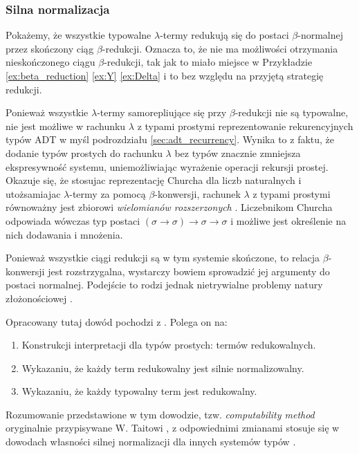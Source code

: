 \subsubsection{Silna normalizacja}
Pokażemy, że wszystkie typowalne \(\lambda\)-termy redukują się do postaci \(\beta\)-normalnej przez skończony ciąg \(\beta\)-redukcji. Oznacza to, że nie ma możliwości otrzymania nieskończonego ciągu \(\beta\)-redukcji, tak jak to miało miejsce w Przykładzie \ref{ex:beta_reduction} \ref{ex:Y} \ref{ex:Delta} i to bez względu na przyjętą strategię redukcji. 

Ponieważ wszystkie \(\lambda\)-termy samorepliujące się przy \(\beta\)-redukcji nie są typowalne, nie jest możliwe  w rachunku \(\lambda\) z typami prostymi reprezentowanie rekurencyjnych typów ADT w myśl podrozdziału \ref{sec:adt_recurrency}. Wynika to z faktu, że dodanie typów prostych do rachunku \(\lambda\) bez typów znacznie zmniejsza ekspresywność systemu, uniemożliwiając wyrażenie operacji rekursji prostej. Okazuje się, że stosujac reprezentację Churcha dla liczb naturalnych i utożsamiajac \(\lambda\)-termy za pomocą \(\beta\)-konwersji, rachunek \(\lambda\) z typami prostymi równoważny jest zbiorowi \emph{wielomianów rozszerzonych} \cite{DBLP:journals/corr/abs-cs-0701022}. Liczebnikom Churcha odpowiada wówczas typ postaci \((\sigma\to\sigma)\to\sigma\to\sigma\) i możliwe jest określenie na nich dodawania i mnożenia.

Ponieważ wszystkie ciągi redukcji są w tym systemie skończone, to relacja \(\beta\)-konwersji jest rozstrzygalna, wystarczy bowiem sprowadzić jej argumenty do postaci normalnej. Podejście to rodzi jednak nietrywialne problemy natury złożonościowej \cite[Podrozdział 3.7]{Urzyczyn2006}.
 
Opracowany tutaj dowód pochodzi z \cite[Dodatek A3]{Hindley:2008:LCI:1388400}. Polega on na:
\begin{enumerate}
  \setlength\itemsep{0em}
  \item Konstrukcji interpretacji dla typów prostych: termów redukowalnych.
  \item Wykazaniu, że każdy term redukowalny jest silnie normalizowalny.
  \item Wykazaniu, że każdy typowalny term jest redukowalny.
\end{enumerate}
Rozumowanie przedstawione w tym dowodzie, tzw. \emph{computability method} oryginalnie przypisywane W. Taitowi \cite{Tait67}, z odpowiednimi zmianami stosuje się w dowodach własności silnej normalizacji dla innych systemów typów \cite[Podrozdział 11.5]{Urzyczyn2006}.

